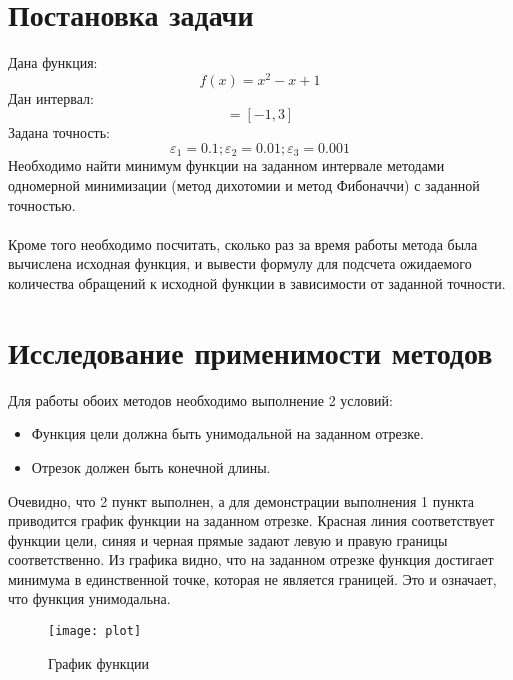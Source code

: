 
\usepackage{amsmath}




\renewcommand\contentsname{\centerline{Содержание}}
\tableofcontents
\newpage

\section{Постановка задачи}
Дана функция:
\begin{equation}
f(x) = x^2 - x + 1
\end{equation}
Дан интервал:
\begin{equation}
[a, b] = [-1, 3]
\end{equation}
Задана точность:
\begin{equation}
\varepsilon_1 = 0.1; \varepsilon_2 = 0.01; \varepsilon_3 = 0.001
\end{equation}
Необходимо найти минимум функции на заданном интервале методами одномерной минимизации (метод дихотомии и метод Фибоначчи) с заданной точностью.\\
\\
Кроме того необходимо посчитать, сколько раз за время работы метода была вычислена исходная функция, и вывести формулу для подсчета ожидаемого количества обращений к исходной функции в зависимости от заданной точности.

\section{Исследование применимости методов}
Для работы обоих методов необходимо выполнение 2 условий:
\begin{itemize}
\item Функция цели должна быть унимодальной на заданном отрезке.
\item Отрезок должен быть конечной длины.
\end{itemize}
Очевидно, что 2 пункт выполнен, а для демонстрации выполнения 1 пункта приводится график функции на заданном отрезке. Красная линия соответствует функции цели, синяя и черная прямые задают левую и правую границы соответственно. Из графика видно, что на заданном отрезке функция достигает минимума в единственной точке, которая не является границей. Это и означает, что функция унимодальна.

\begin{figure}[!htb]
    \centering
    \texttt{[image: plot]}
    \caption{График функции}
    \label{fig:proof}
\end{figure}

